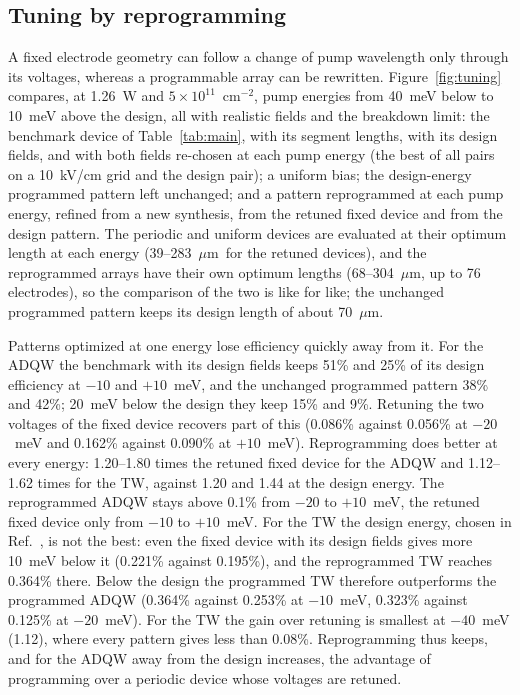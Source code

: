 \documentclass[11pt]{article}
\newcommand{\um}{~$\mu$m}
\begin{document}
\subsection{Tuning by reprogramming}\label{sec:tuning}
A fixed electrode geometry can follow a change of pump wavelength only through its voltages, whereas a programmable array can be rewritten. Figure~\ref{fig:tuning} compares, at 1.26~W and $5\times10^{11}$~cm$^{-2}$, pump energies from 40~meV below to 10~meV above the design, all with realistic fields and the breakdown limit: the benchmark device of Table~\ref{tab:main}, with its segment lengths, with its design fields, and with both fields re-chosen at each pump energy (the best of all pairs on a 10~kV/cm grid and the design pair); a uniform bias; the design-energy programmed pattern left unchanged; and a pattern reprogrammed at each pump energy, refined from a new synthesis, from the retuned fixed device and from the design pattern. The periodic and uniform devices are evaluated at their optimum length at each energy (39--283\um\ for the retuned devices), and the reprogrammed arrays have their own optimum lengths (68--304\um, up to 76 electrodes), so the comparison of the two is like for like; the unchanged programmed pattern keeps its design length of about 70\um.

Patterns optimized at one energy lose efficiency quickly away from it. For the ADQW the benchmark with its design fields keeps 51\% and 25\% of its design efficiency at $-10$ and $+10$~meV, and the unchanged programmed pattern 38\% and 42\%; 20~meV below the design they keep 15\% and 9\%. Retuning the two voltages of the fixed device recovers part of this (0.086\% against 0.056\% at $-20$~meV and 0.162\% against 0.090\% at $+10$~meV). Reprogramming does better at every energy: 1.20--1.80 times the retuned fixed device for the ADQW and 1.12--1.62 times for the TW, against 1.20 and 1.44 at the design energy. The reprogrammed ADQW stays above 0.1\% from $-20$ to $+10$~meV, the retuned fixed device only from $-10$ to $+10$~meV. For the TW the design energy, chosen in Ref.~\cite{OwnbyN1}, is not the best: even the fixed device with its design fields gives more 10~meV below it (0.221\% against 0.195\%), and the reprogrammed TW reaches 0.364\% there. Below the design the programmed TW therefore outperforms the programmed ADQW (0.364\% against 0.253\% at $-10$~meV, 0.323\% against 0.125\% at $-20$~meV). For the TW the gain over retuning is smallest at $-40$~meV (1.12), where every pattern gives less than 0.08\%. Reprogramming thus keeps, and for the ADQW away from the design increases, the advantage of programming over a periodic device whose voltages are retuned.
\end{document}
